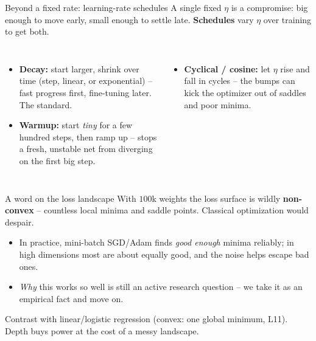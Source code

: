 \documentclass[aspectratio=169]{beamer}
\begin{document}
\begin{frame}{Beyond a fixed rate: learning-rate schedules}
  A single fixed $\eta$ is a compromise: big enough to move early, small enough to settle late.
  \textbf{Schedules} vary $\eta$ over training to get both.
  \vfill
  \begin{columns}[T]
    \begin{itemize}\small
      \item \textbf{Decay:} start larger, shrink over time (step, linear, or exponential) --
        fast progress first, fine-tuning later. The standard.
      \item \textbf{Warmup:} start \emph{tiny} for a few hundred steps, then ramp up -- stops a
        fresh, unstable net from diverging on the first big step.
    \end{itemize}
    \begin{itemize}\small
      \item \textbf{Cyclical / cosine:} let $\eta$ rise and fall in cycles -- the bumps can kick
        the optimizer out of saddles and poor minima.
    \end{itemize}
    \vskip 4pt
  \end{columns}
\end{frame}

\begin{frame}{A word on the loss landscape}
  With $100$k weights the loss surface is wildly \textbf{non-convex} -- countless local minima
  and saddle points. Classical optimization would despair.
  \vfill
  \begin{itemize}\small
    \item In practice, mini-batch SGD/Adam finds \emph{good enough} minima reliably; in high
      dimensions most are about equally good, and the noise helps escape bad ones.
    \item \emph{Why} this works so well is still an active research question -- we take it as an
      empirical fact and move on.
  \end{itemize}
  \vfill
  \footnotesize Contrast with linear/logistic regression (convex: one global minimum, L11).
  Depth buys power at the cost of a messy landscape.
\end{frame}
\end{document}
